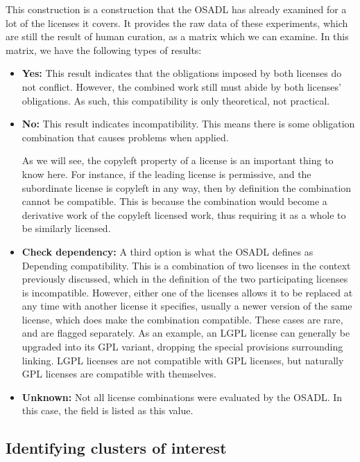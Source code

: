 This construction is a construction that the OSADL has already examined for a lot of the licenses it covers. It provides the raw data of these experiments, which are still the result of human curation, as a matrix which we can examine. In this matrix, we have the following types of results:

\begin{itemize}
	\item \textbf{Yes:} This result indicates that the obligations imposed by both licenses do not conflict. However, the combined work still must abide by both licenses' obligations. As such, this compatibility is only theoretical, not practical.
	\item \textbf{No:} This result indicates incompatibility. This means there is some obligation combination that causes problems when applied.
	
	As we will see, the copyleft property of a license is an important thing to know here. For instance, if the leading license is permissive, and the subordinate license is copyleft in any way, then by definition the combination cannot be compatible. This is because the combination would become a derivative work of the copyleft licensed work, thus requiring it as a whole to be similarly licensed.
	\item \textbf{Check dependency:} A third option is what the OSADL defines as Depending compatibility. This is a combination of two licenses in the context previously discussed, which in the definition of the two participating licenses is incompatible. However, either one of the licenses allows it to be replaced at any time with another license it specifies, usually a newer version of the same license, which does make the combination compatible. These cases are rare, and are flagged separately. As an example, an LGPL license can generally be upgraded into its GPL variant, dropping the special provisions surrounding linking. LGPL licenses are not compatible with GPL licenses, but naturally GPL licenses are compatible with themselves.
	
	\item \textbf{Unknown:} Not all license combinations were evaluated by the OSADL. In this case, the field is listed as this value.
\end{itemize}

\subsection{Identifying clusters of interest}

